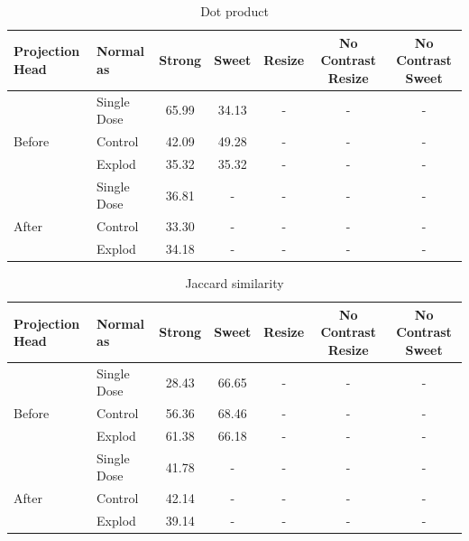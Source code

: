 \begin{table}[H]
  \centering
  \begin{tabular}{@{}llccccc@{}}
  \toprule
  Projection Head & Normal as       & Strong & Sweet & Resize & No Contrast Resize & No Contrast Sweet \\ \midrule
                  & Single Dose    & 65.99      & 34.13     & -      & -                  & -                 \\
  Before          & Control        & 42.09      & 49.28     & -      & -                  & -                 \\
                  & Explod         & 35.32      & 35.32     & -      & -                  & -                 \\ \midrule
                  & Single Dose    & 36.81      & -     & -      & -                  & -                 \\
  After           & Control        & 33.30      & -     & -      & -                  & -                 \\
                  & Explod         & 34.18      & -     & -      & -                  & -                 \\ \bottomrule
  \end{tabular}
  \caption{Dot product}
  \label{tab:table_label}
\end{table}

\begin{table}[H]
  \centering
  \begin{tabular}{@{}llccccc@{}}
  \toprule
  Projection Head & Normal as       & Strong & Sweet & Resize & No Contrast Resize & No Contrast Sweet \\ \midrule
                  & Single Dose    & 28.43      & 66.65     & -      & -                  & -                 \\
  Before          & Control        & 56.36      & 68.46     & -      & -                  & -                 \\
                  & Explod         & 61.38      & 66.18     & -      & -                  & -                 \\ \midrule
                  & Single Dose    & 41.78      & -     & -      & -                  & -                 \\
  After           & Control        & 42.14      & -     & -      & -                  & -                 \\
                  & Explod         & 39.14      & -     & -      & -                  & -                 \\ \bottomrule
  \end{tabular}
  \caption{Jaccard similarity}
  \label{tab:table_label}
\end{table}

